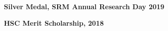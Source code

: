 \documentclass[10pt,a4paper,ragged2e]{altacv}
\begin{document}
\faTrophy\large{\textbf{ Silver Medal, SRM Annual Research Day 2019}}
\begin{itemize}
\begin{comment}\item[\faTrophy]Participated in 'SRM Research Day 2019', held on 26th February 2019 held by SRM IST and successfully bagged \textbf{Silver Medal} for Research Paper on 'SRM Research Day 2019' \end{comment}
\end{itemize}
\smallskip
\faTrophy\large{\textbf{ HSC Merit Scholarship, 2018}}
\smallskip
\begin{comment}
\large{\textbf{National Cyber Olympiad 2018}}
\begin{itemize}
\item[\faTrophy]Secured a \textbf{world rank of 71} in NCO 2018. 
\end{itemize}
\end{comment}
\begin{comment}
Got selected for the Round 2 in NSO after clearing Problem Solving and Science Questionnaire stage, held by Science Olympiad Foundation.\\
\end{comment}
\smallskip

\begin{comment}
\cvsection{SKILLS}

\cvskill{C, C++, Windows}{5}
\divider

\cvskill{Java, \LaTeX, Linux, Word}{4}
\divider

\cvskillf{HTML, JavaScript, Mac OS,\\ PowerPoint, Excel, Photoshop}{3}
\end{comment}


\clearpage
\nocite{*}
\end{document}
